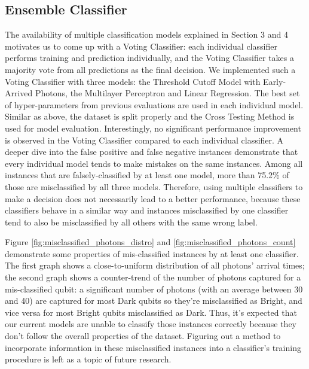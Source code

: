 \documentclass[letterpaper,twocolumn,10pt]{article}
\begin{document}
\subsection{Ensemble Classifier}

The availability of multiple classification models explained in Section 3 and 4 motivates us to come up with a Voting Classifier: each individual classifier performs training and prediction individually, and the Voting Classifier takes a majority vote from all predictions as the final decision. We implemented such a Voting Classifier with three models: the Threshold Cutoff Model with Early-Arrived Photons, the Multilayer Perceptron and Linear Regression. The best set of hyper-parameters from previous evaluations are used in each individual model. Similar as above, the dataset is split properly and the Cross Testing Method is used for model evaluation. Interestingly, no significant performance improvement is observed in the Voting Classifier compared to each individual classifier. A deeper dive into the false positive and false negative instances demonstrate that every individual model tends to make mistakes on the same instances. Among all instances that are falsely-classified by at least one model, more than 75.2\% of those are misclassified by all three models. Therefore, using multiple classifiers to make a decision does not necessarily lead to a better performance, because these classifiers behave in a similar way and instances misclassified by one classifier tend to also be misclassified by all others with the same wrong label.

Figure \ref{fig:misclassified_photons_distro} and \ref{fig:misclassified_photons_count} demonstrate some properties of mis-classified instances by at least one classifier. The first graph shows a close-to-uniform distribution of all photons' arrival times; the second graph shows a counter-trend of the number of photons captured for a mis-classified qubit: a significant number of photons (with an average between 30 and 40) are captured for most Dark qubits so they're misclassified as Bright, and vice versa for most Bright qubits misclassified as Dark. Thus, it's expected that our current models are unable to classify those instances correctly because they don't follow the overall properties of the dataset. Figuring out a method to incorporate information in these misclassified instances into a classifier's training procedure is left as a topic of future research.
\end{document}
